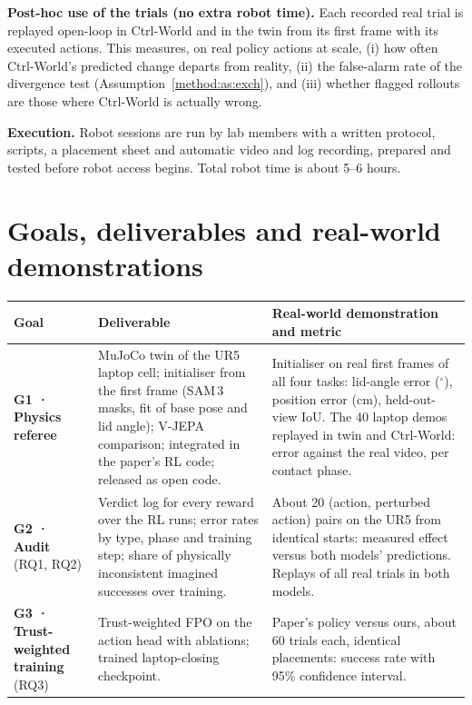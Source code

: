 \textbf{Post-hoc use of the trials (no extra robot time).} Each recorded real trial is replayed open-loop in Ctrl-World and in the twin from its first frame with its executed actions. This measures, on real policy actions at scale, (i) how often Ctrl-World's predicted change departs from reality, (ii) the false-alarm rate of the divergence test (Assumption~\ref{method:as:exch}), and (iii) whether flagged rollouts are those where Ctrl-World is actually wrong.

\textbf{Execution.} Robot sessions are run by lab members with a written protocol, scripts, a placement sheet and automatic video and log recording, prepared and tested before robot access begins. Total robot time is about 5--6 hours.

\section{Goals, deliverables and real-world demonstrations}\label{method:sec:deliverables}
\begin{center}\small
\begin{tabularx}{\linewidth}{@{}>{\raggedright\arraybackslash}p{2.7cm}>{\raggedright\arraybackslash}X>{\raggedright\arraybackslash}X@{}}
\toprule
\textbf{Goal} & \textbf{Deliverable} & \textbf{Real-world demonstration and metric}\\
\midrule
\textbf{G1 · Physics referee} & MuJoCo twin of the UR5 laptop cell; initialiser from the first frame (SAM\,3 masks, fit of base pose and lid angle); V-JEPA comparison; integrated in the paper's RL code; released as open code. & Initialiser on real first frames of all four tasks: lid-angle error ($^\circ$), position error (cm), held-out-view IoU. The 40 laptop demos replayed in twin and Ctrl-World: error against the real video, per contact phase.\\
\midrule
\textbf{G2 · Audit} (RQ1, RQ2) & Verdict log for every reward over the RL runs; error rates by type, phase and training step; share of physically inconsistent imagined successes over training. & About 20 (action, perturbed action) pairs on the UR5 from identical starts: measured effect versus both models' predictions. Replays of all real trials in both models.\\
\midrule
\textbf{G3 · Trust-weighted training} (RQ3) & Trust-weighted FPO on the action head with ablations; trained laptop-closing checkpoint. & Paper's policy versus ours, about 60 trials each, identical placements: success rate with 95\% confidence interval.\\
\bottomrule
\end{tabularx}
\end{center}

